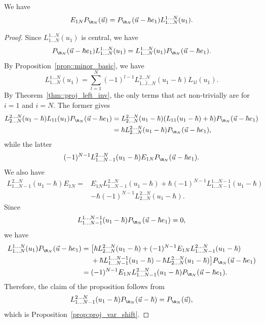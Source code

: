 	\begin{Corollary}
		\label{prop::kirillov_proj_e1n}
		We have
		\[
		E_{1N} P_{\m_N}(\vec{u})= P_{\m_N} (\vec{u} - \hbar e_1) L_{1\dots N}^{1\dots N}(u_1).
		\]
		\begin{proof}
			Since $L_{1\dots N}^{1\dots N}(u_1)$ is central, we have
			\[
			P_{\m_N}(\vec{u}-\hbar e_1) L_{1\dots N}^{1\dots N}(u_1) = L_{1\dots N}^{1\dots N}(u_1) P_{\m_N}(\vec{u}-\hbar e_1).
			\]
			By Proposition~\ref{prop::minor_basic}, we have
			\[
			L_{1\dots N}^{1\dots N}(u_1) = \sum\limits_{l=1}^N (-1)^{l-1} L_{1\dots \hat{l}\dots N}^{2\dots N} (u_1-\hbar) L_{1l}(u_1).
			\]
			By Theorem~\ref{thm::proj_left_inv}, the only terms that act non-trivially are for $i=1$ and $i=N$. The former gives
			\begin{align*}
				L_{2\dots N}^{2\dots N}(u_1-\hbar) L_{11}(u_1) P_{\m_N}(\vec{u}-\hbar e_1)
				={}&L_{2\dots N}^{2\dots N}(u_1-\hbar) (L_{11}(u_1-\hbar) + \hbar) P_{\m_N}(\vec{u}-\hbar e_1) \\
				={}&\hbar L_{2\dots N}^{2\dots N}(u_1-\hbar)P_{\m_N}(\vec{u}-\hbar e_1),
			\end{align*}
			while the latter
			\[
			(-1)^{N-1} L_{1\dots N-1}^{2\dots N}(u_1-\hbar) E_{1N} P_{\m_N}(\vec{u}-\hbar e_1).
			\]
			We also have
			\begin{align*}
			L_{1\dots N-1}^{2\dots N}(u_1-\hbar) E_{1N} ={}& E_{1N} L_{1\dots N-1}^{2\dots N}(u_1-\hbar) + \hbar (-1)^{N-1} L_{1\dots N-1}^{1\dots N-1}(u_1-\hbar)\\& - \hbar (-1)^{N-1} L_{2\dots N}^{2\dots N}(u_1-\hbar).
			\end{align*}
			Since
			\[
			L_{1\dots N-1}^{1\dots N-1}(u_1-\hbar) P_{\m_N}(\vec{u}-\hbar e_1) = 0,
			\]
			we have
			\begin{align*}
				L_{1\dots N}^{1\dots N}(u_1) P_{\m_N}(\vec{u}-\hbar e_1)
				={}& \bigl[\hbar L_{2\dots N}^{2\dots N}(u_1-\hbar)+ (-1)^{N-1} E_{1N} L_{1\dots N-1}^{2\dots N}(u_1-\hbar) \\
				&+ \hbar L_{1\dots N-1}^{1\dots N-1}(u_1-\hbar) - \hbar L_{2\dots N}^{2\dots N}(u_1-\hbar)\bigr] P_{\m_N}(\vec{u}-\hbar e_1) \\
				= {}&(-1)^{N-1} E_{1N} L_{1\dots N-1}^{2\dots N}(u_1-\hbar) P_{\m_N}(\vec{u}-\hbar e_1).
			\end{align*}
			Therefore, the claim of the proposition follows from
			\[
			L_{1\dots N-1}^{2\dots N}(u_1-\hbar) P_{\m_N}(\vec{u}-\hbar) = P_{\m_N}(\vec{u}),
			\]
			which is Proposition~\ref{prop:proj_var_shift}.
		\end{proof}
	\end{Corollary}
